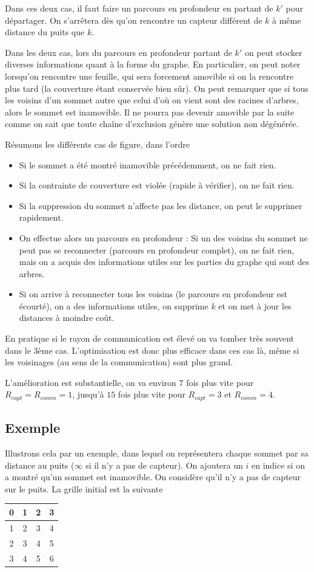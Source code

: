\documentclass[12pt,a4paper]{article}
\begin{document}
Dans ces deux cas, il faut faire un parcours en profondeur en partant de $k'$ pour départager. On s'arrêtera dès qu'on rencontre un capteur différent de $k$ à même distance du puits que $k$. 

Dans les deux cas, lors du parcours en profondeur partant de $k'$ on peut stocker diverses informations quant à la forme du graphe. En particulier, on peut noter lorsqu'on rencontre une feuille, qui sera forcement amovible si on la rencontre plus tard (la couverture étant conservée bien sûr). On peut remarquer que si tous les voisins d'un sommet autre que celui d'où on vient sont des racines d'arbres, alors le sommet est inamovible. Il ne pourra pas devenir amovible par la suite comme on sait que toute chaîne d'exclusion génère une solution non dégénérée.

Résumons les différents cas de figure, dans l'ordre
\begin{itemize}
\item Si le sommet a été montré inamovible précédemment, on ne fait rien.
\item Si la contrainte de couverture est violée (rapide à vérifier), on ne fait rien.
\item Si la suppression du sommet n'affecte pas les distance, on peut le supprimer rapidement.
\item On effectue alors un parcours en profondeur : Si un des voisins du sommet ne peut pas se reconnecter (parcours en profondeur complet), on ne fait rien, mais on a acquis des informations utiles sur les parties du graphe qui sont des arbres.
\item Si on arrive à reconnecter tous les voisins (le parcours en profondeur est écourté), on a des informations utiles, on supprime $k$ et on met à jour les distances à moindre coût. 
\end{itemize}

En pratique si le rayon de communication est élevé on va tomber très souvent dans le 3ème cas. L'optimisation est donc plus efficace dans ces cas là, même si les voisinages (au sens de la communication) sont plus grand.

L'amélioration est substantielle, on va environ $7$ fois plus vite pour $R_{capt}=R_{comm}=1$, jusqu'à $15$ fois plus vite pour $R_{capt}= 3$ et $R_{comm}=4$.
\subsection{Exemple}
Illustrons cela par un exemple, dans lequel on représentera chaque sommet par sa distance au puits ($\infty$ si il n'y a pas de capteur). On ajoutera un $i$ en indice si on a montré qu'un sommet est inamovible.
On considère qu'il n'y a pas de capteur sur le puits. La grille initial est la suivante
\begin{center}
\begin{tabular}{|c|c|c|c|}
\hline 
0 & 1 & 2 & 3 \\ 
\hline 
1 & 2 & 3 & 4 \\ 
\hline 
2 & 3 & 4 & 5 \\ 
\hline 
3 & 4 & 5 & 6 \\ 
\hline 
\end{tabular}
\end{center}
\end{document}
